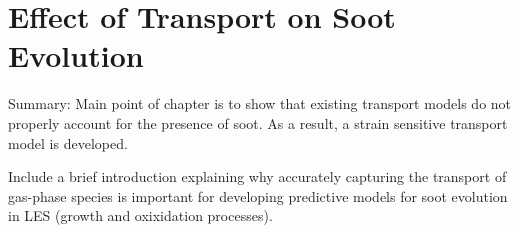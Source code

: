 \chapter{Effect of Transport on Soot Evolution\label{ch:transport}}

Summary: Main point of chapter is to show that existing transport models do not properly account for the presence of soot. As a result, a strain sensitive transport model is developed.

Include a brief introduction explaining why accurately capturing the transport of gas-phase species is important for developing predictive models for soot evolution in LES (growth and oxixidation processes).



